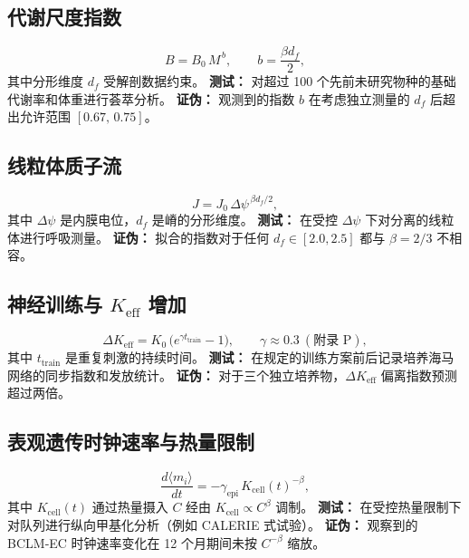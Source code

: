 \documentclass[11pt,a4paper]{article}
\begin{document}
	\subsection{代谢尺度指数}
	
	\begin{equation}\label{eq:pred-metab}
		B = B_0\,M^{\,b}, \qquad
		b = \frac{\beta d_f}{2},
	\end{equation}
	其中分形维度 \(d_f\) 受解剖数据约束。
	\textbf{测试：} 对超过 100 个先前未研究物种的基础代谢率和体重进行荟萃分析。
	\textbf{证伪：} 观测到的指数 \(b\) 在考虑独立测量的 \(d_f\) 后超出允许范围 \([0.67,\,0.75]\)。
	
	\subsection{线粒体质子流}
	
	\begin{equation}\label{eq:pred-mito}
		J = J_0\,\Delta\psi^{\,\beta d_f/2},
	\end{equation}
	其中 \(\Delta\psi\) 是内膜电位，\(d_f\) 是嵴的分形维度。
	\textbf{测试：} 在受控 \(\Delta\psi\) 下对分离的线粒体进行呼吸测量。
	\textbf{证伪：} 拟合的指数对于任何 \(d_f\in[2.0,2.5]\) 都与 \(\beta=2/3\) 不相容。
	
	\subsection{神经训练与 \(K_{\mathrm{eff}}\) 增加}
	
	\begin{equation}\label{eq:pred-neural}
		\Delta K_{\mathrm{eff}} = K_0\,
		\bigl(e^{\gamma t_{\mathrm{train}}}-1\bigr),\qquad
		\gamma \approx 0.3\ (\text{附录~P}),
	\end{equation}
	其中 \(t_{\mathrm{train}}\) 是重复刺激的持续时间。
	\textbf{测试：} 在规定的训练方案前后记录培养海马网络的同步指数和发放统计。
	\textbf{证伪：} 对于三个独立培养物，\(\Delta K_{\mathrm{eff}}\) 偏离指数预测超过两倍。
	
	\subsection{表观遗传时钟速率与热量限制}
	
	\begin{equation}\label{eq:pred-epi}
		\frac{d\langle m_i\rangle}{dt} =
		-\gamma_{\mathrm{epi}}\, K_{\mathrm{cell}}(t)^{-\beta},
	\end{equation}
	其中 \(K_{\mathrm{cell}}(t)\) 通过热量摄入 \(C\) 经由
	\(K_{\mathrm{cell}} \propto C^{\beta}\) 调制。
	\textbf{测试：} 在受控热量限制下对队列进行纵向甲基化分析（例如 CALERIE 式试验）。
	\textbf{证伪：} 观察到的 BCLM‑EC 时钟速率变化在 12 个月期间未按 \(C^{-\beta}\) 缩放。
	
\end{document}
